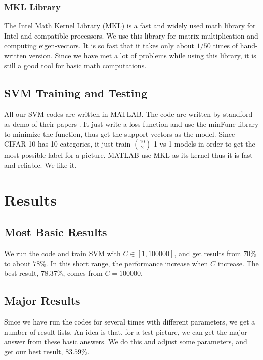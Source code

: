 \documentclass[12pt,abstract=true]{scrartcl}
\numberwithin{equation}{section}
\theoremstyle{definition}   \newtheorem{definition}{Definition}[section]
\theoremstyle{plain}        \newtheorem{theorem}{Theorem}[section]
\theoremstyle{plain}        \newtheorem{observation}{Observation}[section]
\theoremstyle{plain}        \newtheorem{fact}{Fact}[section]
\theoremstyle{plain}        \newtheorem{claim}{Claim}[section]
\theoremstyle{plain}        \newtheorem{lemma}[theorem]{Lemma}
\theoremstyle{plain}        \newtheorem{corollary}[theorem]{Corollary}
\theoremstyle{remark}       \newtheorem{example}{Example}[section]
\theoremstyle{remark}       \newtheorem{remark}{Remark}[section]
\newcommand{\scorebest}{$83.59\%$}
\newcommand{\scorebasic}{$78.37\%$}
\begin{document}
		\subsubsection{MKL Library}
			The Intel Math Kernel Library (MKL) is a
				fast and widely used math library for Intel and compatible processors.
			We use this library for matrix multiplication and computing eigen-vectors.
			It is so fast that it takes only about $1/50$ times of hand-written version.
			Since we have met a lot of problems	while using this library,
				it is still a good tool for basic math computations.
				
	\subsection{SVM Training and Testing}
		All our SVM codes are written in MATLAB.
		The code are written by standford as demo of their papers \cite{rf}\cite{singlelayer}.
		It just write a loss function and use the minFunc library
			to minimize the function,
			thus get the support vectors as the model.
		Since CIFAR-10 has 10 categories,
			it just train $\binom{10}{2}$ 1-vs-1 models
			in order to get the most-possible label for a picture.
		MATLAB use MKL as its kernel thus it is fast and reliable.
		We like it.

\section{Results}
	\subsection{Most Basic Results}
		We run the code and train SVM with $C\in[1,100000]$,
			and get results from $70\%$ to about $78\%$.
		In this short range,
			the performance increase when $C$ increase.
		The best result, \scorebasic, comes from $C=100000$.
	
	\subsection{Major Results}
		Since we have run the codes for several times with different parameters,
			we get a number of result lists.
		An idea is that, for a test picture, we can get the major answer from
			these basic answers.
		We do this and adjust some parameters, and get our
			best result, \scorebest.

	


\end{document}

